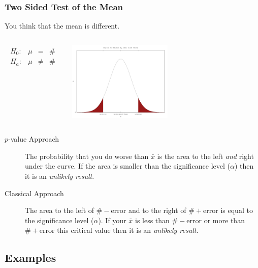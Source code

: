 \begin{frame}
  \frametitle{Two Sided Test of the Mean}

  \vspace*{-1em}

  You think that the mean is different.

  \begin{columns}
    \begin{eqnarray*}
      \begin{array}{lrcl}
        H_0: & \mu & = & \# \\
        H_a: & \mu & \neq & \#
      \end{array}
    \end{eqnarray*}


    \includegraphics[width=5cm]{img/twoSideHypothesisTest}

  \end{columns}

  \begin{description}
  \item[$p$-value Approach] The probability that you do worse than
    $\bar{x}$ is the area to the left \textit{and} right under the
    curve. If the area is smaller than the significance level
    ($\alpha$) then it is an \textit{unlikely result}.
  \item[Classical Approach] The area to the left of
    $\#-\mathrm{error}$ and to the right of $\#+\mathrm{error}$ is
    equal to the significance level ($\alpha$). If your $\bar{x}$ is
    less than $\#-\mathrm{error}$ or more than $\#+\mathrm{error}$
    this critical value then it is an \textit{unlikely result}.
  \end{description}


\end{frame}



\subsection{Examples}


